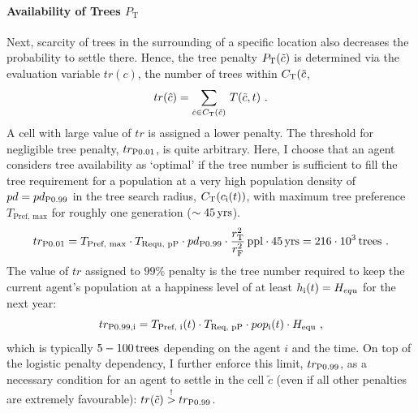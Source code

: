 \paragraph{Availability of Trees $P_\text{T}$}
Next, scarcity of trees in the surrounding of a specific location also decreases the probability to settle there.
Hence, the tree penalty $P_{\rm T}(\tilde{c})$ is determined via the evaluation variable $tr(c)$, the number of trees within $C_{\rm T}(\tilde{c}$,
\begin{equation}
	tr(\hat{c}) = \sum_{\hat{c} \in C_{\rm T}(\tilde{c})}\, T(\tilde{c},t) \ .
\end{equation}
A cell with large value of $tr$ is assigned a lower penalty.
The threshold for negligible tree penalty, $tr_{\rm P0.01}$, is quite arbitrary.
Here, I choose that an agent considers tree availability as `optimal' if the tree number is sufficient to fill the tree requirement for a population at a very high population density of $pd = pd_{\rm P0.99}$ in the tree search radius, $C_{\rm T}(c_{\rm i}(t))$, with maximum tree preference $T_\text{Pref, max}$  for roughly one generation ($\sim 45\, {\rm yrs}$).
\begin{equation}
tr_{\rm P0.01} = T_\text{Pref, max} \cdot T_\text{Requ, pP} \cdot pd_{\rm P0.99} \cdot \frac{r_{\rm T}^2}{r_{\rm F}^{2}} \, {\rm ppl} \cdot 45\, {\rm yrs} = 
216\cdot 10^3 \, {\rm trees} \ .
\end{equation} 
The value of $tr$ assigned to $99\%$ penalty is the tree number required to keep the current agent's population at a happiness level of at least $h_{\rm i}(t) = H_{equ}$ for the next year:
\begin{equation}%
tr_{\rm P0.99, i}= T_\text{Pref, i}(t) \cdot T_\text{Req, pP} \cdot pop_{\rm i}(t) \cdot H_\text{equ} \ ,
\end{equation}
which is typically $5-100\, {\rm trees}$ depending on the agent $i$ and the time.
On top of the logistic penalty dependency, I further enforce this limit, $tr_{\rm P0.99}$, as a necessary condition for an agent to settle in the cell $\tilde{c}$ (even if all other penalties are extremely favourable): $tr(\tilde{c}) \stackrel{!}{>} tr_{\rm P0.99}$. 
